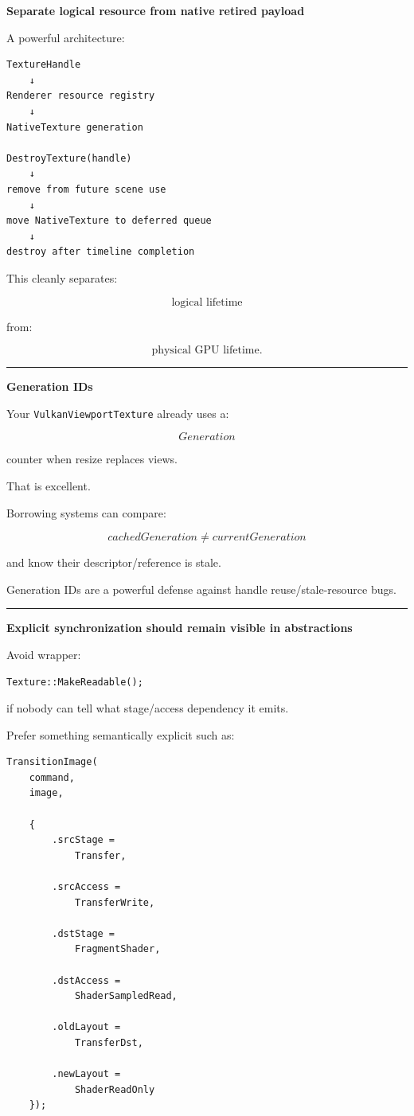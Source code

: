 \textbf{Separate logical resource from native retired payload}

A powerful architecture:

\begin{verbatim}
TextureHandle
    ↓
Renderer resource registry
    ↓
NativeTexture generation

DestroyTexture(handle)
    ↓
remove from future scene use
    ↓
move NativeTexture to deferred queue
    ↓
destroy after timeline completion
\end{verbatim}

This cleanly separates:

\[
\text{logical lifetime}
\]

from:

\[
\text{physical GPU lifetime}.
\]

\begin{center}\rule{0.5\linewidth}{0.5pt}\end{center}

\textbf{Generation IDs}

Your \texttt{VulkanViewportTexture} already uses a:

\[
Generation
\]

counter when resize replaces views.

That is excellent.

Borrowing systems can compare:

\[
cachedGeneration
\neq
currentGeneration
\]

and know their descriptor/reference is stale.

Generation IDs are a powerful defense against handle reuse/stale-resource bugs.

\begin{center}\rule{0.5\linewidth}{0.5pt}\end{center}

\textbf{Explicit synchronization should remain visible in abstractions}

Avoid wrapper:

\begin{verbatim}
Texture::MakeReadable();
\end{verbatim}

if nobody can tell what stage/access dependency it emits.

Prefer something semantically explicit such as:

\begin{verbatim}
TransitionImage(
    command,
    image,

    {
        .srcStage =
            Transfer,

        .srcAccess =
            TransferWrite,

        .dstStage =
            FragmentShader,

        .dstAccess =
            ShaderSampledRead,

        .oldLayout =
            TransferDst,

        .newLayout =
            ShaderReadOnly
    });
\end{verbatim}

